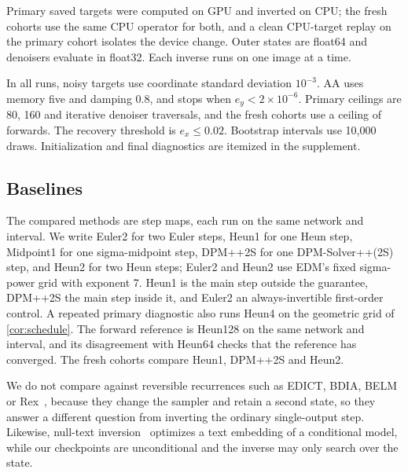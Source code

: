 Primary saved targets were computed on GPU and inverted on CPU; the fresh cohorts use the same CPU operator for both, and a clean CPU-target replay on the primary cohort isolates the device change. Outer states are float64 and denoisers evaluate in float32. Each inverse runs on one image at a time.

In all runs, noisy targets use coordinate standard deviation $10^{-3}$. AA uses memory five and damping $0.8$, and stops when $e_y<2\times10^{-6}$. Primary ceilings are 80, 160 and \PrimaryCap{} iterative denoiser traversals, and the fresh cohorts use a ceiling of \FFHQCap{} forwards. The recovery threshold is $e_x\le0.02$. Bootstrap intervals use 10,000 draws. Initialization and final diagnostics are itemized in the supplement.

\subsection{Baselines}
\label{sec:baselines}
The compared methods are step maps, each run on the same network and interval. We write Euler2 for two Euler steps, Heun1 for one Heun step, Midpoint1 for one sigma-midpoint step, DPM++2S for one DPM-Solver++(2S) step, and Heun2 for two Heun steps; Euler2 and Heun2 use EDM's fixed sigma-power grid with exponent 7. Heun1 is the main step outside the guarantee, DPM++2S the main step inside it, and Euler2 an always-invertible first-order control. A repeated primary diagnostic also runs Heun4 on the geometric grid of \cref{cor:schedule}. The forward reference is Heun128 on the same network and interval, and its disagreement with Heun64 checks that the reference has converged. The fresh cohorts compare Heun1, DPM++2S and Heun2.

We do not compare against reversible recurrences such as EDICT, BDIA, BELM or Rex~\cite{wallace2023,zhang2024,wang2024,rex2026}, because they change the sampler and retain a second state, so they answer a different question from inverting the ordinary single-output step. Likewise, null-text inversion~\cite{mokady2023} optimizes a text embedding of a conditional model, while our checkpoints are unconditional and the inverse may only search over the state.

